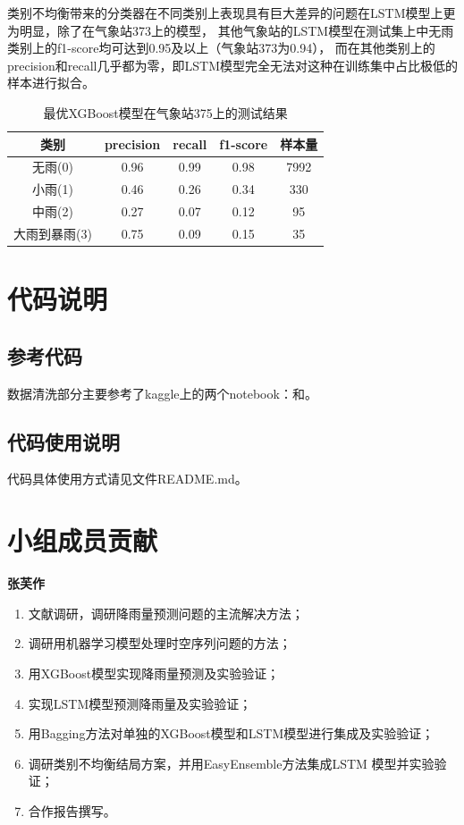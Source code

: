 \documentclass[UTF8]{ctexart}
\begin{document}
类别不均衡带来的分类器在不同类别上表现具有巨大差异的问题在LSTM模型上更为明显，除了在气象站373上的模型，
其他气象站的LSTM模型在测试集上中无雨类别上的f1-score均可达到0.95及以上（气象站373为0.94），
而在其他类别上的precision和recall几乎都为零，即LSTM模型完全无法对这种在训练集中占比极低的样本进行拟合。


\begin{table}[htb]
  \centering
  \begin{minipage}[t]{\linewidth}
  \centering
  \caption{最优XGBoost模型在气象站375上的测试结果}
  \label{tab:xgb-375}
    \begin{tabular}{ccccc}
      \toprule[1pt]
      类别 & precision & recall & f1-score & 样本量\\
      \midrule[0.5pt]
      无雨(0) & 0.96 & 0.99 & 0.98 & 7992\\
      小雨(1) & 0.46 & 0.26 & 0.34 & 330 \\
      中雨(2) & 0.27 & 0.07 & 0.12 & 95 \\
      大雨到暴雨(3) & 0.75 & 0.09 & 0.15 & 35\\
      \bottomrule[1pt]
    \end{tabular}
  \end{minipage}
\end{table}

\section{代码说明}
\subsection{参考代码}
数据清洗部分主要参考了kaggle上的两个notebook：\cite{bit7}和\cite{big8}。


\subsection{代码使用说明}
代码具体使用方式请见文件README.md。

\section{小组成员贡献}
\textbf{张芙作}
  \begin{enumerate}
    \item 文献调研，调研降雨量预测问题的主流解决方法；
    \item 调研用机器学习模型处理时空序列问题的方法；
    \item 用XGBoost模型实现降雨量预测及实验验证；
    \item 实现LSTM模型预测降雨量及实验验证；
    \item 用Bagging方法对单独的XGBoost模型和LSTM模型进行集成及实验验证；
    \item 调研类别不均衡结局方案，并用EasyEnsemble方法集成LSTM
    模型并实验验证；
    \item 合作报告撰写。
  \end{enumerate}
\end{document}
